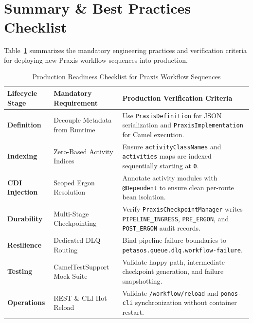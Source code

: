 \section{Summary \& Best Practices Checklist}
\label{sec:praxis_checklist}

Table~\ref{tab:praxis_readiness_checklist} summarizes the mandatory engineering practices and verification criteria for deploying new Praxis workflow sequences into production.

\begin{table}[htbp]
\centering
\small
\begin{tabularx}{\textwidth}{l p{4.2cm} X}
\toprule
\textbf{Lifecycle Stage} & \textbf{Mandatory Requirement} & \textbf{Production Verification Criteria} \\
\midrule
\textbf{Definition} & Decouple Metadata from Runtime & Use \texttt{PraxisDefinition} for JSON serialization and \texttt{PraxisImplementation} for Camel execution. \\
\textbf{Indexing} & Zero-Based Activity Indices & Ensure \texttt{activityClassNames} and \texttt{activities} maps are indexed sequentially starting at \texttt{0}. \\
\textbf{CDI Injection} & Scoped Ergon Resolution & Annotate activity modules with \texttt{@Dependent} to ensure clean per-route bean isolation. \\
\textbf{Durability} & Multi-Stage Checkpointing & Verify \texttt{PraxisCheckpointManager} writes \texttt{PIPELINE\_INGRESS}, \texttt{PRE\_ERGON}, and \texttt{POST\_ERGON} audit records. \\
\textbf{Resilience} & Dedicated DLQ Routing & Bind pipeline failure boundaries to \texttt{petasos.queue.dlq.workflow-failure}. \\
\textbf{Testing} & CamelTestSupport Mock Suite & Validate happy path, intermediate checkpoint generation, and failure snapshotting. \\
\textbf{Operations} & REST \& CLI Hot Reload & Validate \texttt{/workflow/reload} and \texttt{ponos-cli} synchronization without container restart. \\
\bottomrule
\end{tabularx}
\caption{Production Readiness Checklist for Praxis Workflow Sequences}
\label{tab:praxis_readiness_checklist}
\end{table}
